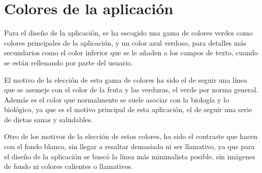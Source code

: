 \section{Colores de la aplicación}
Para el diseño de la aplicación, se ha escogido una gama de colores verdes como colores principales de la aplicación, y un color azul verdoso, para detalles más secundarios como el color inferior que se le añaden a los campos de texto, cuando se están rellenando por parte del usuario.

El motivo de la elección de esta gama de colores ha sido el de seguir una línea que se asemeje con el color de la fruta y las verduras, el verde por norma general. Además es el color que normalmente se suele asociar con la biología y lo biológico, ya que es el motivo principal de esta aplicación, el de seguir una serie de dietas sanas y saludables.

Otro de los motivos de la elección de estos colores, ha sido el contraste que hacen con el fondo blanco, sin llegar a resaltar demasiado ni ser llamativo, ya que para el diseño de la aplicación se buscó la línea más minimalista posible, sin imágenes de fondo ni colores calientes o llamativos.
